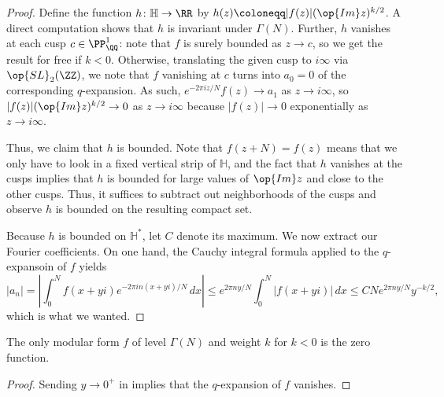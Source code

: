 \documentclass{amsart}
\begin{document}
\begin{proof}
	Define the function $h\colon\mathbb H\to\RR$ by $h(z)\coloneqq|f(z)|(\op{Im}z)^{k/2}$. A direct computation shows that $h$ is invariant under $\Gamma(N)$. Further, $h$ vanishes at each cusp $c\in\PP^1_\QQ$: 
	note that $f$ is surely bounded as $z\to c$, so we get the result for free if $k<0$. Otherwise, translating the given cusp to $i\infty$ via $\op{SL}_2(\ZZ)$, we note that $f$ vanishing at $c$ turns into $a_0=0$ of the corresponding $q$-expansion. As such, $e^{-2\pi iz/N}f(z)\to a_1$ as $z\to i\infty$, so $|f(z)|(\op{Im}z)^{k/2}\to 0$ as $z\to i\infty$ because $\left|f(z)\right|\to0$ exponentially as $z\to i\infty$.

	Thus, we claim that $h$ is bounded. Note that $f(z+N)=f(z)$ means that we only have to look in a fixed vertical strip of $\mathbb H$, and the fact that $h$ vanishes at the cusps implies that $h$ is bounded for large values of $\op{Im}z$ and close to the other cusps. Thus, it suffices to subtract out neighborhoods of the cusps and observe $h$ is bounded on the resulting compact set.

	Because $h$ is bounded on $\mathbb H^*$, let $C$ denote its maximum. We now extract our Fourier coefficients. On one hand, the Cauchy integral formula applied to the $q$-expansoin of $f$ yields
	\[\left|a_n\right|=\left|\int_0^Nf(x+yi)e^{-2\pi in(x+yi)/N}\,dx\right|\le e^{2\pi ny/N}\int_0^N\left|f(x+yi)\right|\,dx\le CNe^{2\pi ny/N}y^{-k/2},\]
	which is what we wanted.
\end{proof}
\begin{corollary}
	The only modular form $f$ of level $\Gamma(N)$ and weight $k$ for $k<0$ is the zero function.
\end{corollary}
\begin{proof}
	Sending $y\to0^+$ in  implies that the $q$-expansion of $f$ vanishes.
\end{proof}
\end{document}
